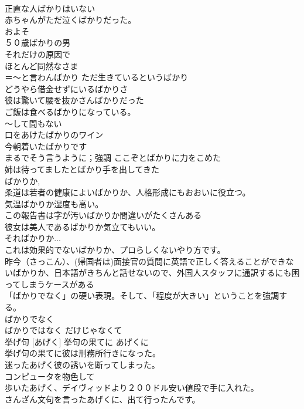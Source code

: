 \documentclass[8pt]{extreport}
\begin{document}
\begin{CJK}{UTF8}{min}
\\	正直な人ばかりはいない 
\\	赤ちゃんがただ泣くばかりだった。 
\\	およそ 
\\	５０歳ばかりの男 
\\	それだけの原因で 
\\	ほとんど同然なさま 
\\	＝～と言わんばかり ただ生きているというばかり 
\\	どうやら借金せずにいるばかりさ 
\\	彼は驚いて腰を抜かさんばかりだった 
\\	ご飯は食べるばかりになっている。 
\\	～して間もない 
\\	口をあけたばかりのワイン 
\\	今朝着いたばかりです 
\\	まるでそう言うように；強調 ここぞとばかりに力をこめた 
\\	姉は待ってましたとばかり手を出してきた 
\\	ばかりか,
\\	柔道は若者の健康によいばかりか、人格形成にもおおいに役立つ。 
\\	気温ばかりか湿度も高い。 
\\	この報告書は字が汚いばかりか間違いがたくさんある 
\\	彼女は美人であるばかりか気立てもいい。 
\\	そればかりか... 
\\	これは効果的でないばかりか、プロらしくないやり方です。
\\	昨今（さっこん）、(帰国者は)面接官の質問に英語で正しく答えることができないばかりか、日本語がきちんと話せないので、外国人スタッフに通訳するにも困ってしまうケースがある 
\\	「ばかりでなく」の硬い表現。そして、「程度が大きい」ということを強調する。 
\\	ばかりでなく 
\\	ばかりではなく だけじゃなくて
\\	挙げ句 [あげく] 挙句の果てに あげくに	
\\	挙げ句の果てに彼は刑務所行きになった。 
\\	迷ったあげく彼の誘いを断ってしまった。 
\\	コンピュータを物色して
\\	歩いたあげく、デイヴィッドより２００ドル安い値段で手に入れた。 
\\	さんざん文句を言ったあげくに、出て行ったんです。 

\end{CJK}
\end{document}
